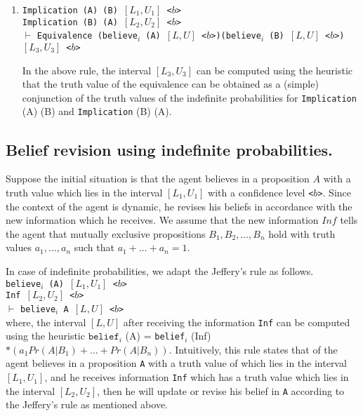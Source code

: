 \documentclass[12pt]{article}
\begin{document}
\begin{enumerate}
\item
\texttt{Implication (A) (B) $[L_1,U_1]$ <$b$>}\\
\texttt{Implication (B) (A) $[L_2,U_2]$ <$b$>}\\
$\vdash$
\texttt{Equivalence (believe$_i$ (A) $[L,U]$ <$b$>)}\texttt{(believe$_i$ (B) $[L,U]$ <$b$>) $[L_3,U_3]$ <$b$>}

In the above rule, the interval $[L_3,U_3]$ can be computed using the heuristic that the truth value of the equivalence can be obtained as a (simple) conjunction of the truth values of the indefinite probabilities for \texttt{Implication} (A) (B) and \texttt{Implication} (B) (A).

\end{enumerate}

\subsection{Belief revision using indefinite probabilities.}  Suppose the initial situation is that the agent believes in a proposition $A$ with a truth value which lies in the interval $[L_1,U_1]$ with a confidence level \texttt{<$b$>}. Since the context of the agent is dynamic, he revises his beliefs in accordance with the new information which he receives. We assume that the new information $Inf$ tells the agent that mutually exclusive propositions $B_1, B_2, \ldots, B_n$ hold with truth values $a_1,\ldots,a_n$ such that $a_1+\ldots+a_n=1$. 


In case of indefinite probabilities, we adapt the Jeffery's rule \cite{Jeffrey1983} as follows.\\

\noindent \texttt{believe$_i$ (A) $[L_1,U_1]$ <$b$>}\\
\noindent \texttt{Inf $[L_2,U_2]$ <$b$>}\\
$\vdash$
\noindent \texttt{believe$_i$ A $[L,U]$ <$b$>}\\

where, the interval $[L,U]$ after receiving the information \texttt{Inf} can be computed using the heuristic $\texttt{belief}_i$ (A) = \texttt{belief}$_i$ (Inf) $\ast (a_1 Pr(A|B_1) + \ldots + Pr(A|B_n))$. Intuitively, this rule states that of the agent believes in a proposition \texttt{A} with a truth value of which lies in the interval $[L_1,U_1]$, and he receives information \texttt{Inf} which has a truth value which lies in the interval $[L_2,U_2]$, then he will update or revise his belief in \texttt{A} according to the Jeffery's rule as mentioned above. \\
\end{document}
